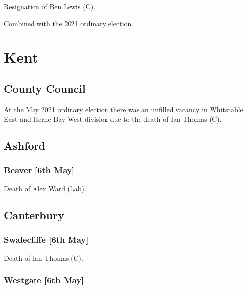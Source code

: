 \documentclass[a4paper,openany]{book}
\begin{document}
\begin{resultsiii}

Resignation of Ben Lewis (C).

Combined with the 2021 ordinary election.

\section{Kent}

\subsection*{County Council}

At the May 2021 ordinary election there was an unfilled vacancy in Whitstable East and Herne Bay West division due to the death of Ian Thomas (C).

\subsection*{Ashford}

\subsubsection*{Beaver \hspace*{\fill}\nolinebreak[1]%
	\enspace\hspace*{\fill}
	[6th May]}


Death of Alex Ward (Lab).

\subsection*{Canterbury}

\subsubsection*{Swalecliffe \hspace*{\fill}\nolinebreak[1]%
	\enspace\hspace*{\fill}
	[6th May]}


Death of Ian Thomas (C).

\subsubsection*{Westgate \hspace*{\fill}\nolinebreak[1]%
	\enspace\hspace*{\fill}
	[6th May]}


\end{resultsiii}
\end{document}

